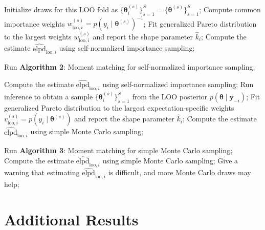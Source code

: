 \documentclass[12pt]{article}
\newcommand{\ome}{v}
\begin{document}
\begin{appendices}
\begin{algorithm*}[htb]
\begin{algorithmic}[1]
		\STATE Initialize draws for this LOO fold as $\{ \boldsymbol{\theta}_i^{(s)} \}_{s = 1}^S = \{ \boldsymbol{\theta}^{(s)} \}_{s = 1}^S$;
		\STATE Compute common importance weights $w_{\text{loo},i}^{(s)} = p (y_i \mid \boldsymbol{\theta}^{(s)})^{-1}$;
		\STATE Fit generalized Pareto distribution to the largest weights $w_{\text{loo},i}^{(s)}$ and report the shape parameter $\hat{k}_i$;
%
		\STATE Compute the estimate $\widehat{\text{elpd}}_{\text{loo},i}$ using self-normalized importance sampling;
		\ELSE
		
		\STATE Run \textbf{Algorithm 2}: Moment matching for self-normalized importance sampling;

		\STATE Compute the estimate $\widehat{\text{elpd}}_{\text{loo},i}$ using self-normalized importance sampling;
		\ELSE
		\STATE Run inference to obtain a sample $\{ \boldsymbol{\theta}_i^{(s)} \}_{s = 1}^S$ from the LOO posterior $p (\boldsymbol{\theta} \mid \mathbf{y}_{-i})$;
		\STATE Fit generalized Pareto distribution to the largest expectation-specific weights
		$\ome_{\text{loo},i}^{(s)} = p(y_i \mid \boldsymbol{\theta}^{(s)})$ and report the shape parameter $\hat{k}_i$;
		\STATE Compute the estimate $\widehat{\text{elpd}}_{\text{loo},i}$ using simple Monte Carlo sampling;
		\ELSE
		
		
		
		\STATE Run \textbf{Algorithm 3}: Moment matching for simple Monte Carlo sampling;
		\STATE Compute the estimate $\widehat{\text{elpd}}_{\text{loo},i}$ using simple Monte Carlo sampling;
        \ELSE
		\STATE Give a warning that estimating $\widehat{\text{elpd}}_{\text{loo},i}$ is difficult, and more Monte Carlo draws may help;
		\ENDIF
		
		\ENDIF
		\ENDIF
		\ENDIF
		\ENDFOR
		 
	\end{algorithmic}
\end{algorithm*}






\section{Additional Results}
\label{appendix:results}






\end{appendices}
\end{document}

